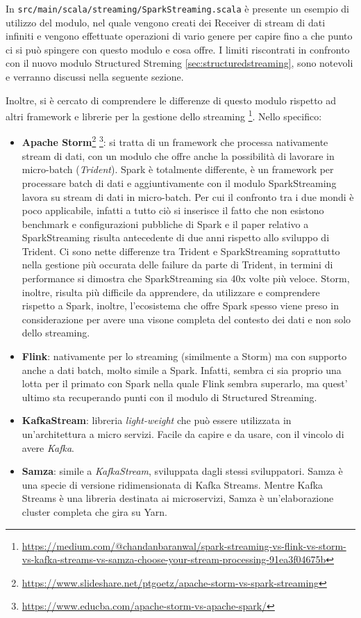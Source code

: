 \documentclass[12pt,italian]{article}
\begin{document}
\par In \texttt{src/main/scala/streaming/SparkStreaming.scala} è presente un esempio di utilizzo del modulo, nel quale vengono creati dei Receiver di stream di dati infiniti e vengono effettuate operazioni di vario genere per capire fino a che punto ci si può spingere con questo modulo e cosa offre. I limiti riscontrati in confronto con il nuovo modulo Structured Streming \ref{sec:structuredstreaming}, sono notevoli e verranno discussi nella seguente sezione.

\par Inoltre, si è cercato di comprendere le differenze di questo modulo rispetto ad altri framework e librerie per la gestione dello streaming \footnote{\url{https://medium.com/@chandanbaranwal/spark-streaming-vs-flink-vs-storm-vs-kafka-streams-vs-samza-choose-your-stream-processing-91ea3f04675b}}. Nello specifico:
\begin{itemize}
	\item \textbf{Apache Storm}\footnote{\url{https://www.slideshare.net/ptgoetz/apache-storm-vs-spark-streaming}} \footnote{\url{https://www.educba.com/apache-storm-vs-apache-spark/}}: si tratta di un framework che processa nativamente stream di dati, con un modulo che offre anche la possibilità di lavorare in micro-batch (\textit{Trident}). Spark è totalmente differente, è un framework per processare batch di dati e aggiuntivamente con il modulo SparkStreaming lavora su stream di dati in micro-batch. Per cui il confronto tra i due mondi è poco applicabile, infatti a tutto ciò si inserisce il fatto che non esistono benchmark e configurazioni pubbliche di Spark e il paper relativo a SparkStreaming\cite{sparkStreaming} risulta antecedente di due anni rispetto allo sviluppo di Trident. Ci sono nette differenze tra Trident e SparkStreaming soprattutto nella gestione più occurata delle failure da parte di Trident, in termini di performance si dimostra che SparkStreaming sia 40x volte più veloce.
	Storm, inoltre, risulta più difficile da apprendere, da utilizzare e comprendere rispetto a Spark, inoltre, l'ecosistema che offre Spark spesso viene preso in considerazione per avere una visone completa del contesto dei dati e non solo dello streaming.
	\item \textbf{Flink}: nativamente per lo streaming (similmente a Storm) ma con supporto anche a dati batch, molto simile a Spark. Infatti, sembra ci sia proprio una lotta per il primato con Spark nella quale Flink sembra superarlo, ma quest' ultimo sta recuperando punti con il modulo di Structured Streaming.
	\item \textbf{KafkaStream}: libreria \textit{light-weight} che può essere utilizzata in un'architettura a micro servizi. Facile da capire e da usare, con il vincolo di avere \textit{Kafka}. 
	\item \textbf{Samza}: simile a \textit{KafkaStream}, sviluppata dagli stessi sviluppatori. Samza è una specie di versione ridimensionata di Kafka Streams. Mentre Kafka Streams è una libreria destinata ai microservizi, Samza è un'elaborazione cluster completa che gira su Yarn.
\end{itemize}
\end{document}
